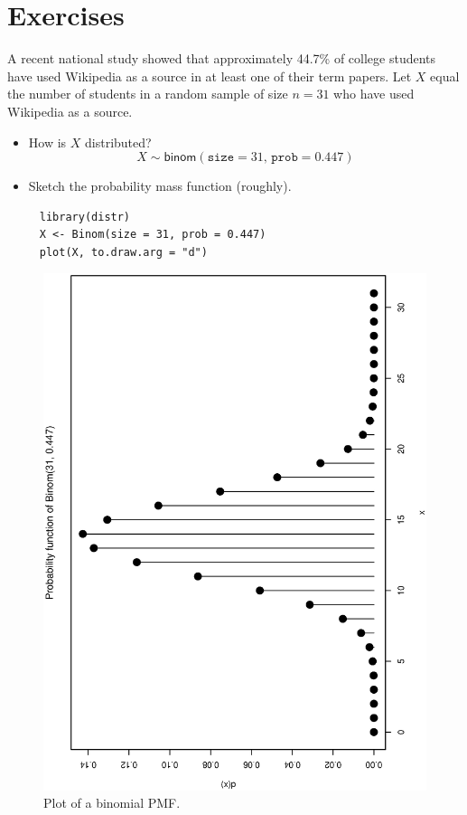 \documentclass[captions=tableheading]{scrbook}
\begin{document}
\section{Exercises}
\label{sec-5-8}

\setcounter{thm}{0}

\begin{xca}
A recent national study showed that approximately 44.7\% of college students have used Wikipedia as a source in at least one of their term papers. Let \(X\) equal the number of students in a random sample of size \(n=31\) who have used Wikipedia as a source. 
\begin{itemize}
\item How is \(X\) distributed? 
     \[
     X\sim\mathsf{binom}(\mathtt{size}=31,\,\mathtt{prob}=0.447)
     \]
\item Sketch the probability mass function (roughly).
\end{itemize}

\begin{verbatim}
     library(distr)
     X <- Binom(size = 31, prob = 0.447)
     plot(X, to.draw.arg = "d")
\end{verbatim}


     \begin{figure}[th]
	      \includegraphics[angle=270, totalheight=4in]{img/binomdxca.ps}
	      \caption[Plot of a binomial PMF]{\small Plot of a binomial PMF.}
	      \label{fig:binomdxca}
	    \end{figure}


\end{xca}
\end{document}
